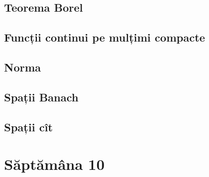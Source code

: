 \documentclass[a4paper,12pt]{article}
\theoremstyle{change}
\begin{document}
\subsection{Teorema Borel}

\subsection{Funcții continui pe mulțimi compacte}


\subsection{Norma}


\subsection{Spații Banach}

\subsection{Spații cît}

\section{Săptămâna 10}


\end{document}

